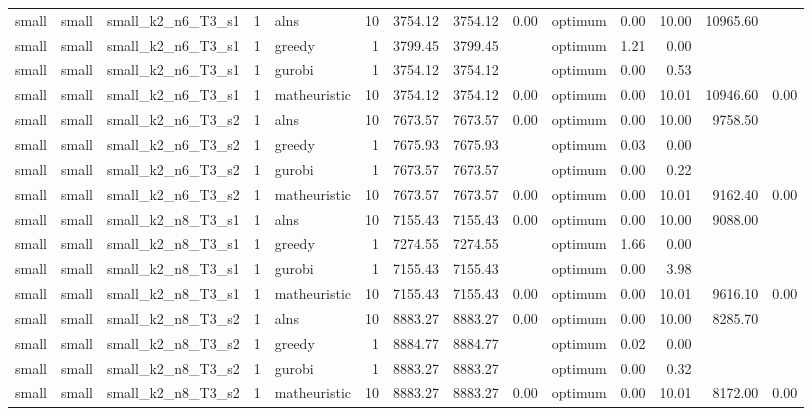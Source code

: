 \begin{tabular}{lllrlrrrrlrrrr}
small & small & small\_k2\_n6\_T3\_s1 & 1 & alns & 10 & 3754.12 & 3754.12 & 0.00 & optimum & 0.00 & 10.00 & 10965.60 &  \\
small & small & small\_k2\_n6\_T3\_s1 & 1 & greedy & 1 & 3799.45 & 3799.45 &  & optimum & 1.21 & 0.00 &  &  \\
small & small & small\_k2\_n6\_T3\_s1 & 1 & gurobi & 1 & 3754.12 & 3754.12 &  & optimum & 0.00 & 0.53 &  &  \\
small & small & small\_k2\_n6\_T3\_s1 & 1 & matheuristic & 10 & 3754.12 & 3754.12 & 0.00 & optimum & 0.00 & 10.01 & 10946.60 & 0.00 \\
small & small & small\_k2\_n6\_T3\_s2 & 1 & alns & 10 & 7673.57 & 7673.57 & 0.00 & optimum & 0.00 & 10.00 & 9758.50 &  \\
small & small & small\_k2\_n6\_T3\_s2 & 1 & greedy & 1 & 7675.93 & 7675.93 &  & optimum & 0.03 & 0.00 &  &  \\
small & small & small\_k2\_n6\_T3\_s2 & 1 & gurobi & 1 & 7673.57 & 7673.57 &  & optimum & 0.00 & 0.22 &  &  \\
small & small & small\_k2\_n6\_T3\_s2 & 1 & matheuristic & 10 & 7673.57 & 7673.57 & 0.00 & optimum & 0.00 & 10.01 & 9162.40 & 0.00 \\
small & small & small\_k2\_n8\_T3\_s1 & 1 & alns & 10 & 7155.43 & 7155.43 & 0.00 & optimum & 0.00 & 10.00 & 9088.00 &  \\
small & small & small\_k2\_n8\_T3\_s1 & 1 & greedy & 1 & 7274.55 & 7274.55 &  & optimum & 1.66 & 0.00 &  &  \\
small & small & small\_k2\_n8\_T3\_s1 & 1 & gurobi & 1 & 7155.43 & 7155.43 &  & optimum & 0.00 & 3.98 &  &  \\
small & small & small\_k2\_n8\_T3\_s1 & 1 & matheuristic & 10 & 7155.43 & 7155.43 & 0.00 & optimum & 0.00 & 10.01 & 9616.10 & 0.00 \\
small & small & small\_k2\_n8\_T3\_s2 & 1 & alns & 10 & 8883.27 & 8883.27 & 0.00 & optimum & 0.00 & 10.00 & 8285.70 &  \\
small & small & small\_k2\_n8\_T3\_s2 & 1 & greedy & 1 & 8884.77 & 8884.77 &  & optimum & 0.02 & 0.00 &  &  \\
small & small & small\_k2\_n8\_T3\_s2 & 1 & gurobi & 1 & 8883.27 & 8883.27 &  & optimum & 0.00 & 0.32 &  &  \\
small & small & small\_k2\_n8\_T3\_s2 & 1 & matheuristic & 10 & 8883.27 & 8883.27 & 0.00 & optimum & 0.00 & 10.01 & 8172.00 & 0.00 \\
\bottomrule
\end{tabular}

